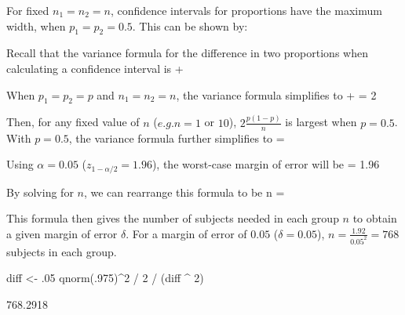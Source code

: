  \item For fixed $n_{1} = n_2 = n$, confidence intervals for proportions have the maximum width, when $p_{1} = p_{2} =  0.5$.  This can be shown by:
  \bi
  \item Recall that the variance formula for the difference in two proportions when calculating a confidence interval is 
   \beq
   +
    \eeq
  \item When $p_{1} = p_{2} =  p$ and $n_{1} = n_2 = n$, the variance formula simplifies to 
    \beq
     + = 2
    \eeq
   \item Then, for any fixed value of $n$ ($e.g. n = 1$ or $10$), $2\frac{p(1 - p)}{n}$ is largest when $p = 0.5$.  With $p= 0.5$, the variance formula further simplifies to
     = 
    \eeq
  \ei
 \item Using $\alpha = 0.05$ ($z_{1-\alpha/2} = 1.96$), the worst-case margin of error will be
    \beq
     \delta = 1.96 
    \eeq
 \item By solving for $n$, we can rearrange this formula to be
    \beq
     n = 
    \eeq
 \item This formula then gives the number of subjects needed in each group $n$ to obtain a given margin of error $\delta$.  For a margin of error of $0.05$ ($\delta = 0.05$), $n = \frac{1.92}{0.05^2} = 768$ subjects in each group.
\begin{Schunk}
\begin{Sinput}
diff <- .05
qnorm(.975)^2 / 2 / (diff ^ 2)
\end{Sinput}
\begin{Soutput}
[1] 768.2918
\end{Soutput}
\end{Schunk}
\ei


